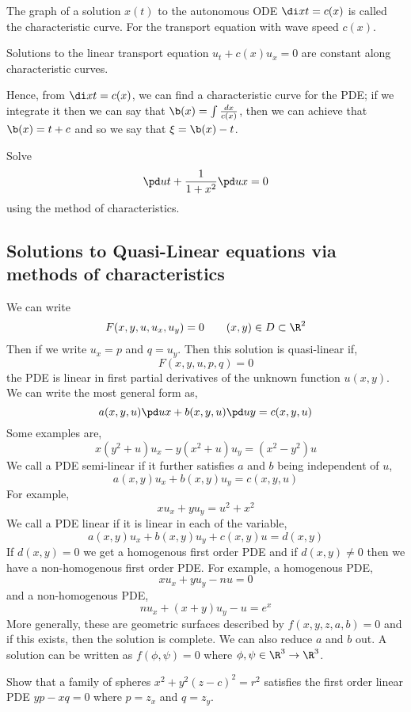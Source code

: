 \begin{ndefi}
  The graph of a solution $x(t)$ to the autonomous ODE $\di x t = c(x)$ is called the characteristic curve. For the transport equation with wave speed $c(x)$.
\end{ndefi}

\begin{nprop}
   Solutions to the linear transport equation $u_t + c(x) u_x = 0$ are constant along characteristic curves.
\end{nprop}

Hence, from $\di x t = c(x)$, we can find a characteristic curve for the PDE; if we integrate it then we can say that $\b(x) = \int \frac{dx}{c(x)}$, then we can achieve that $\b(x) = t + c$ and so we say that $\xi = \b(x) - t$.

\begin{eg}
  Solve
  $$ \pd u t + \frac{1}{1 + x^2}\pd u x = 0 $$
  using the method of characteristics.
\end{eg}

\subsection{Solutions to Quasi-Linear equations via methods of characteristics}
We can write
$$ F(x, y , u, u_x, u_y) = 0 \qquad (x, y) \in D \subset \R^2$$
Then if we write $u_x = p$ and $q = u_y$. Then this solution is quasi-linear if,
$$ F(x, y, u, p, q) = 0 $$
the PDE is linear in first partial derivatives of the unknown function $u(x, y)$. We can write the most general form as,
$$ a(x, y, u)\pd u x + b(x, y, u)\pd u y = c(x, y, u) $$
Some examples are,
$$ x(y^2 + u)u_x - y(x^2 + u)u_y = (x^2 - y^2)u $$
We call a PDE semi-linear if it further satisfies $a$ and $b$ being independent of $u$,
$$ a(x, y)u_x + b(x, y)u_y = c(x, y, u) $$
For example,
$$ xu_x + yu_y = u^2 + x^2 $$
We call a PDE linear if it is linear in each of the variable,
$$ a(x, y)u_x + b(x, y)u_y + c(x, y)u = d(x, y) $$
If $d(x, y) = 0$ we get a homogenous first order PDE and if $d(x, y) \ne 0$ then we have a non-homogenous first order PDE. For example, a homogenous PDE,
$$ xu_x + yu_y - nu = 0 $$
and a non-homogenous PDE,
$$ nu_x + (x + y)u_y - u = e^x $$
More generally, these are geometric surfaces described by $f(x, y, z, a, b) = 0$ and if this exists, then the solution is complete. We can also reduce $a$ and $b$ out. A solution can be written as $f(\phi, \psi) = 0$ where $\phi, \psi \in \R^3 \to \R^3$.

\begin{eg}
  Show that a family of spheres $x^2 + y^2 (z - c)^2 = r^2$ satisfies the first order linear PDE $yp - xq = 0$ where $p = z_x$ and $q = z_y$.
\end{eg}

